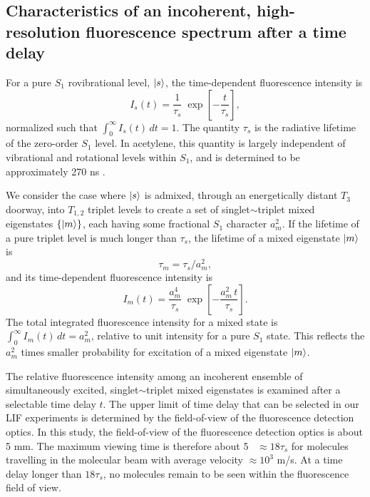 \documentclass[12pt]{mitthesis}
\begin{document}
\subsection{Characteristics of an incoherent, high-resolution
  fluorescence spectrum after a time delay}

For a pure $S_1$ rovibrational level, $\mathinner{|{s}\rangle}$, the time-dependent
fluorescence intensity is
\begin{equation}
  I_s(t) = \frac{1}{\tau_s} \;
           \exp \left[
             -\frac{t}{ \tau_s} 
           \right],
\end{equation}
normalized such that $\int_0^{\infty} I_s(t) \, dt = 1$.  The quantity
$\tau_s$ is the radiative lifetime of the zero-order $S_1$ level.  In
acetylene, this quantity is largely independent of vibrational and
rotational levels within $S_1$, and is determined to be approximately
270 ns \cite{ochi91, stephenson84}.

We consider the case where $\mathinner{|{s}\rangle}$ is admixed, through an
energetically distant $T_3$ doorway, into $T_{1,2}$ triplet levels to
create a set of singlet$\sim$triplet mixed eigenstates $\lbrace
\mathinner{|{m}\rangle} \rbrace$, each having some fractional $S_1$ character $a_m^2$.
If the lifetime of a pure triplet level is much longer than $\tau_s$,
the lifetime of a mixed eigenstate $\mathinner{|{m}\rangle}$ is
\begin{equation}
  \label{eq:tau-m}
  \tau_m = \tau_s / a_m^2,
\end{equation}
and its time-dependent fluorescence intensity is
\begin{equation}
  \label{eq:int-m}
  I_m(t) = \frac{a_m^4}{\tau_s} \;
           \exp \left[
             -\frac{a_m^2 \, t}{\tau_s} 
           \right].
\end{equation}
The total integrated fluorescence intensity for a mixed state is
$\int_0^{\infty} I_m(t) \, dt = a_m^2$, relative to unit intensity for
a pure $S_1$ state.  This reflects the $a_m^2$ times smaller
probability for excitation of a mixed eigenstate $\mathinner{|{m}\rangle}$.

The relative fluorescence intensity among an incoherent ensemble of
simultaneously excited, singlet$\sim$triplet mixed eigenstates is
examined after a selectable time delay $t$.  The upper limit of time
delay that can be selected in our LIF experiments is determined by the
field-of-view of the fluorescence detection optics.  In this study,
the field-of-view of the fluorescence detection optics is about 5 mm.
The maximum viewing time is therefore about 5 \microsec\ $\approx
18\tau_s$ for molecules travelling in the molecular beam with average
velocity $\approx 10^3$ m/s.  At a time delay longer than $18\tau_s$,
no molecules remain to be seen within the fluorescence field of view.
\end{document}
